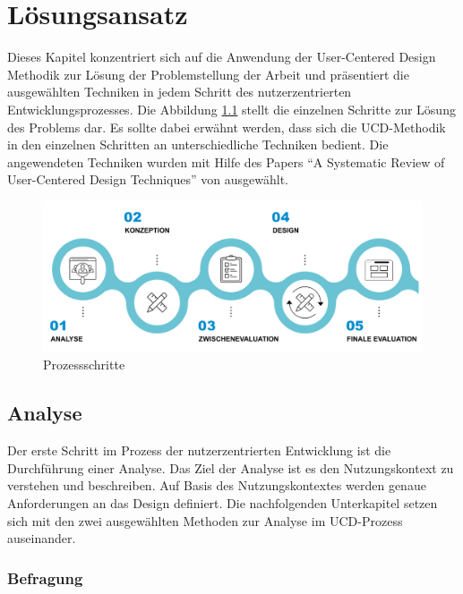 \chapter{Lösungsansatz}\label{ch:approach}
Dieses Kapitel konzentriert sich auf die Anwendung der User-Centered Design Methodik zur Lösung der Problemstellung der Arbeit und präsentiert die ausgewählten Techniken in jedem Schritt des nutzerzentrierten Entwicklungsprozesses.
Die Abbildung \ref{fig:approach} stellt die einzelnen Schritte zur Lösung des Problems dar.
Es sollte dabei erwähnt werden, dass sich die \ac{UCD}-Methodik in den einzelnen Schritten an unterschiedliche Techniken bedient.
Die angewendeten Techniken wurden mit Hilfe des Papers \enquote{A Systematic Review of User-Centered Design Techniques} von \citet{salinas_2020} ausgewählt.

\begin{figure}[h]
	\centering
    	\includegraphics[width=\textwidth]{Images/Ansatz}
   	\caption{Prozessschritte}
   	\label{fig:approach}
\end{figure}

\section{Analyse}

Der erste Schritt im Prozess der nutzerzentrierten Entwicklung ist die Durchführung einer Analyse.
Das Ziel der Analyse ist es den Nutzungskontext zu verstehen und beschreiben.
Auf Basis des Nutzungskontextes werden genaue Anforderungen an das Design definiert.
Die nachfolgenden Unterkapitel setzen sich mit den zwei ausgewählten Methoden zur Analyse im \ac{UCD}-Prozess auseinander.

\subsection{Befragung}\label{ch:interview}

